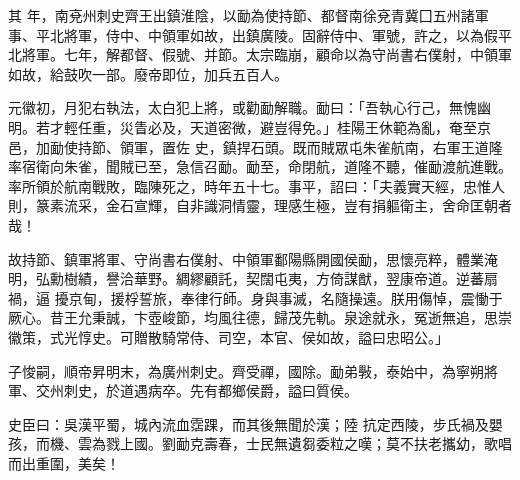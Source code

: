 \begin{pinyinscope}
 其
 年，南兗州刺史齊王出鎮淮陰，以勔為使持節、都督南徐兗青冀囗五州諸軍事、平北將軍，侍中、中領軍如故，出鎮廣陵。固辭侍中、軍號，許之，以為假平北將軍。七年，解都督、假號、并節。太宗臨崩，顧命以為守尚書右僕射，中領軍如故，給鼓吹一部。廢帝即位，加兵五百人。



 元徽初，月犯右執法，太白犯上將，或勸勔解職。勔曰：「吾執心行己，無愧幽明。若才輕任重，災眚必及，天道密微，避豈得免。」桂陽王休範為亂，奄至京邑，加勔使持節、領軍，置佐
 史，鎮捍石頭。既而賊眾屯朱雀航南，右軍王道隆率宿衛向朱雀，聞賊已至，急信召勔。勔至，命閉航，道隆不聽，催勔渡航進戰。率所領於航南戰敗，臨陳死之，時年五十七。事平，詔曰：「夫義實天經，忠惟人則，篆素流采，金石宣輝，自非識洞情靈，理感生極，豈有捐軀衛主，舍命匡朝者哉！



 故持節、鎮軍將軍、守尚書右僕射、中領軍鄱陽縣開國侯勔，思懷亮粹，體業淹明，弘勳樹績，譽洽華野。綢繆顧託，契闊屯夷，方倚謀猷，翌康帝道。逆蕃扇禍，逼
 擾京甸，援桴誓旅，奉律行師。身與事滅，名隨操遠。朕用傷悼，震慟于厥心。昔王允秉誠，卞壺峻節，均風往德，歸茂先軌。泉途就永，冤逝無追，思崇徽策，式光惇史。可贈散騎常侍、司空，本官、侯如故，謚曰忠昭公。」



 子悛嗣，順帝昇明末，為廣州刺史。齊受禪，國除。勔弟斅，泰始中，為寧朔將軍、交州刺史，於道遇病卒。先有都鄉侯爵，謚曰質侯。



 史臣曰：吳漢平蜀，城內流血霑踝，而其後無聞於漢；陸
 抗定西陵，步氏禍及嬰孩，而機、雲為戮上國。劉勔克壽春，士民無遺芻委粒之嘆；莫不扶老攜幼，歌唱而出重圍，美矣！



\end{pinyinscope}